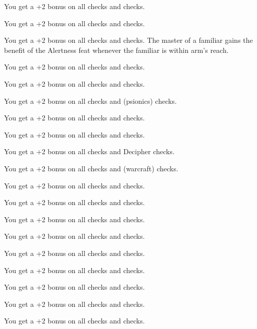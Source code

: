 
{You get a +2 bonus on all  checks and  checks.}

{You get a +2 bonus on all  checks and  checks.}

{You get a +2 bonus on all  checks and  checks.}
{}
{The master of a familiar gains the benefit of the Alertness feat whenever the familiar is within arm's reach.}

{You get a +2 bonus on all  checks and  checks.}

{You get a +2 bonus on all  checks and  checks.}

{You get a +2 bonus on all  checks and  (psionics) checks.}

{You get a +2 bonus on all  checks and  checks.}

{You get a +2 bonus on all  checks and  checks.}

{You get a +2 bonus on all  checks and Decipher  checks.}

{You get a +2 bonus on all  checks and  (warcraft) checks.}

{You get a +2 bonus on all  checks and  checks.}

{You get a +2 bonus on all  checks and  checks.}

{You get a +2 bonus on all  checks and  checks.}

{You get a +2 bonus on all  checks and  checks.}

{You get a +2 bonus on all  checks and  checks.}

{You get a +2 bonus on all  checks and  checks.}

{You get a +2 bonus on all  checks and  checks.}

{You get a +2 bonus on all  checks and  checks.}

{You get a +2 bonus on all  checks and  checks.}